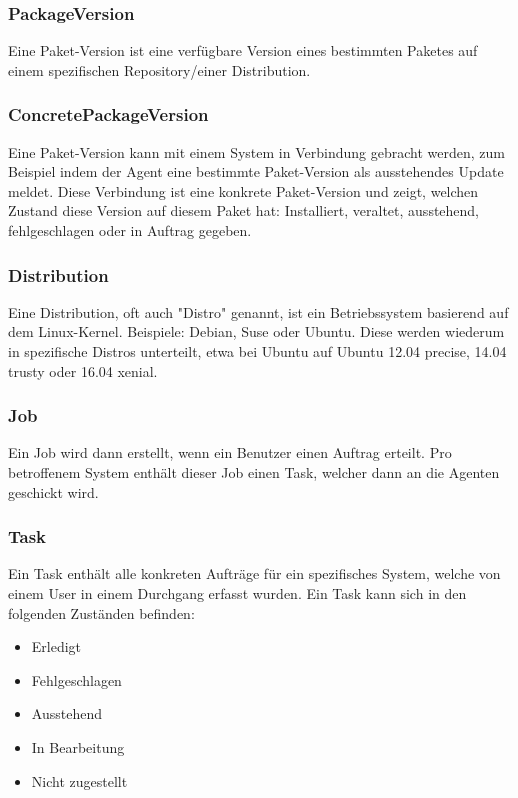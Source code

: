\subsubsection{PackageVersion}

Eine Paket-Version ist eine verfügbare Version eines bestimmten Paketes auf einem spezifischen Repository/einer Distribution.

\subsubsection{ConcretePackageVersion}

Eine Paket-Version kann mit einem System in Verbindung gebracht werden, zum Beispiel indem der Agent eine bestimmte Paket-Version als ausstehendes Update meldet. Diese Verbindung ist eine konkrete Paket-Version und zeigt, welchen Zustand diese Version auf diesem Paket hat: Installiert, veraltet, ausstehend, fehlgeschlagen oder in Auftrag gegeben.

\subsubsection{Distribution}

Eine Distribution, oft auch "Distro" genannt, ist ein Betriebssystem basierend auf dem Linux-Kernel. Beispiele: Debian, Suse oder Ubuntu. Diese werden wiederum in spezifische Distros unterteilt, etwa bei Ubuntu auf Ubuntu 12.04 precise, 14.04 trusty oder 16.04 xenial. 

\subsubsection{Job}

Ein Job wird dann erstellt, wenn ein Benutzer einen Auftrag erteilt. Pro betroffenem System enthält dieser Job einen Task, welcher dann an die Agenten geschickt wird.

\subsubsection{Task}

Ein Task enthält alle konkreten Aufträge für ein spezifisches System, welche von einem User in einem Durchgang erfasst wurden. Ein Task kann sich in den folgenden Zuständen befinden:

\begin{itemize}
    \item Erledigt 
    \item Fehlgeschlagen 
    \item Ausstehend
    \item In Bearbeitung
    \item Nicht zugestellt
\end{itemize}

